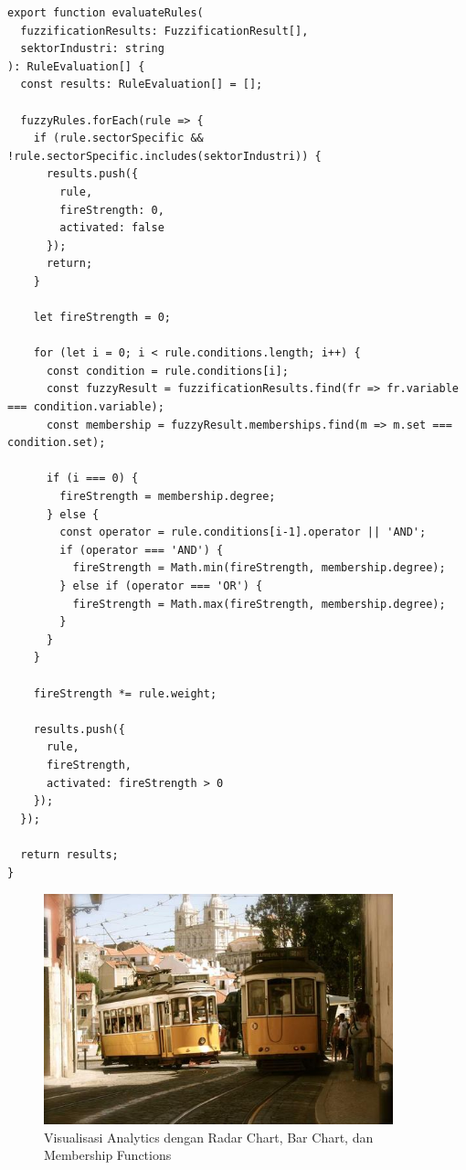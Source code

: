 \documentclass[12pt,a4paper]{article}
\begin{document}
\begin{verbatim}
export function evaluateRules(
  fuzzificationResults: FuzzificationResult[], 
  sektorIndustri: string
): RuleEvaluation[] {
  const results: RuleEvaluation[] = [];
  
  fuzzyRules.forEach(rule => {
    if (rule.sectorSpecific && !rule.sectorSpecific.includes(sektorIndustri)) {
      results.push({
        rule,
        fireStrength: 0,
        activated: false
      });
      return;
    }
    
    let fireStrength = 0;
    
    for (let i = 0; i < rule.conditions.length; i++) {
      const condition = rule.conditions[i];
      const fuzzyResult = fuzzificationResults.find(fr => fr.variable === condition.variable);
      const membership = fuzzyResult.memberships.find(m => m.set === condition.set);
      
      if (i === 0) {
        fireStrength = membership.degree;
      } else {
        const operator = rule.conditions[i-1].operator || 'AND';
        if (operator === 'AND') {
          fireStrength = Math.min(fireStrength, membership.degree);
        } else if (operator === 'OR') {
          fireStrength = Math.max(fireStrength, membership.degree);
        }
      }
    }
    
    fireStrength *= rule.weight;
    
    results.push({
      rule,
      fireStrength,
      activated: fireStrength > 0
    });
  });
  
  return results;
}
\end{verbatim}

\begin{figure}[H]
    \centering
    \includegraphics[width=0.9\textwidth]{assets/image.png}
    \caption{Visualisasi Analytics dengan Radar Chart, Bar Chart, dan Membership Functions}
    \label{fig:analytics}
\end{figure}
\end{document}

